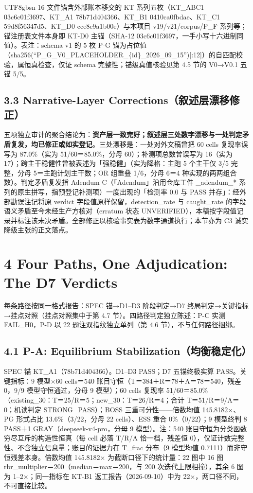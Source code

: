 \documentclass[10pt,a4paper]{article}
\begin{document}
\begin{CJK}{UTF8}{gbsn}
16 文件锚含外部账本移交的 KT 系列五枚（KT\_ABC1 03c6c01f3697、KT\_A1 78b71d404366、KT\_B1 0410ca0fbdae、KT\_C1 59d8f56347d5、KT\_D0 cce8e9a1b00e）与本项目 v19/v21/corpus/P\_F 系列等；锚注册表文件本身即 KT-D0 主锚（SHA-12 03c6c01f3697，一手小写十六进制同值）。表注：schema v1 的 5 枚 P-G 锚为占位值（sha256(``P\_G\_V0\_PLACEHOLDER\_\{id\}\_2026\_09\_15'')[:12]）的自匹配校验，属恒真检查，仅证 schema 完整性；锚级真值核验见第 4.5 节的 V0→V0.1 五锚 5/5。

\subsection*{3.3 Narrative-Layer Corrections（叙述层漂移修正）}五项独立审计的聚合结论为：\textbf{资产层一致完好；叙述层三处数字漂移与一处判定矛盾复发，均已修正或如实登记}。三处漂移是：一处对外文稿曾把 60 cells 复现率误写为 87.0\%（实为 51/60＝85.0\%，分母 60）；补测项总数曾误写为 16（实为 17）；跨主干稳健性曾被表述为「强稳健」（实为降格：主跑 5 个主干仅 3/5 完整，分母 5＝主跑计划主干数；OR 组重叠 1/6，分母 6＝4 种实现的两两组合数）。判定矛盾复发指 Adendum C（「Adendum」沿用仓库工件 \_adendum\_* 系列的原生拼写，指预登记补测项）一度出现的「检测率 0.0 与 PASS 并存」：经外部勘误注记将原 verdict 字段值原样保留，detection\_rate 与 caught\_rate 的字段语义矛盾至今未经生产方核对（erratum 状态 UNVERIFIED），本稿按字段值记录并标注该未决矛盾。全部修正以核验事实表为数字通道执行；本节亦为 C3 诚实降级主张的正文落点。


\section*{4 Four Paths, One Adjudication: The D7 Verdicts}每条路径按同一格式报告：SPEC 锚→D1–D3 阶段判定→D7 终局判定→关键指标→挂点对照（挂点对照集中于第 4.7 节）。四路径判定独立陈述：P-C 实测 FAIL\_H0，P-D 以 22 题注双指纹独立单列（第 4.6 节），不与任何路径捆绑。

\subsection*{4.1 P-A: Equilibrium Stabilization（均衡稳定化）}SPEC 锚 KT\_A1（78b71d404366）。D1–D3 PASS；D7 五锚终极实算 PASS。关键指标：9 模型×60 cells＝540 账目守恒（T＝384＋R＝78＋A＝78＝540，残差 0，9/9 模型守恒通过，分母 9 模型）；60 cells 复现率 51/60＝85.0\%（existing\_30：T＝25/R＝5；new\_30：T＝26/R＝4；合计 T＝51/R＝9/A＝0；机读判定 STRONG\_PASS）；BOSS 三重可分性——倍数均值 145.8182×、PG 形式占比 13.6\%（3/22，分母 22 cells）、ESS 重合 0\%（0/22）；9 模型终判 8 PASS＋1 GRAY（deepseek-v4-pro，分母 9 模型）。注：540 账目守恒为分类函数穷尽互斥的构造性恒真（每 cell 必落 T/R/A 恰一档，残差恒 0），仅证计数完整性、不含独立信息量；账目的证据力在 T\_frac 分布（9 模型均值 0.7111）而非守恒残差本身。倍数均值 145.8182× 为截断口径下的统计量：22 图中 16 图 rbr\_multiplier＝200（median＝max＝200，与 200 次迭代上限相撞），其余 6 图为 1–2×；同一指标在 KT-B1 返工报告（2026-09-10）中为 22×，两口径不同，不可直接比较。


\end{CJK}
\end{document}
